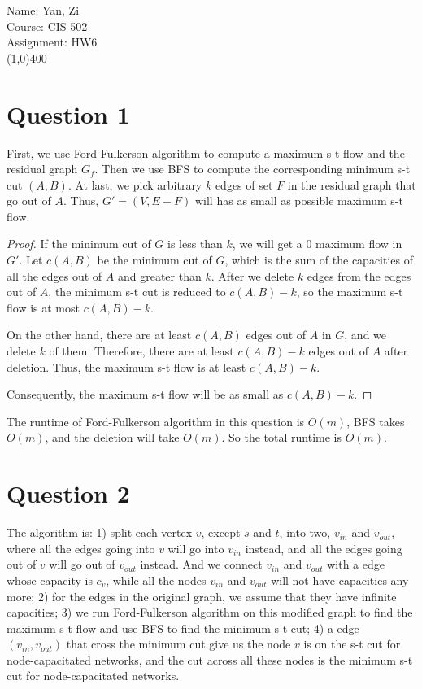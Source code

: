 \documentclass[letter,12pt]{article}
\begin{document}
Name: Yan, Zi \\
Course: CIS 502 \\
Assignment: HW6 \\
\line(1,0){400}
\section*{Question 1}
First, we use Ford-Fulkerson algorithm to compute a maximum s-t flow and 
the residual graph $G_f$. Then we use BFS to compute the corresponding 
minimum s-t cut $(A, B)$. At last, we pick arbitrary $k$ edges of set $F$ in 
the residual graph that go out of $A$. Thus, $G'=(V, E - F)$ will has as small 
as possible maximum s-t flow.

\begin{proof}
If the minimum cut of $G$ is less than $k$, we will get a 0 maximum flow in
$G'$. Let $c(A, B)$ be the minimum cut of $G$, which is the sum of the 
capacities of all the edges out of $A$ and greater than $k$. After we delete 
$k$ edges from the edges out of $A$, the minimum s-t cut is reduced to 
$c(A, B) - k$, so the maximum s-t flow is at most $c(A, B)-k$.

On the other hand, there are at least $c(A, B)$ edges out of $A$ in $G$, and 
we delete $k$ of them. Therefore, there are at least $c(A, B)-k$ edges out of
$A$ after deletion. Thus, the maximum s-t flow is at least $c(A, B)-k$.

Consequently, the maximum s-t flow will be as small as $c(A, B)-k$.
\end{proof}

The runtime of Ford-Fulkerson algorithm in this question is $O(m)$, BFS
takes $O(m)$, and the deletion will take $O(m)$. So the total runtime is
$O(m)$.

\section*{Question 2}
The algorithm is: 1) split each vertex $v$, except $s$ and $t$, into two, 
$v_{in}$ and $v_{out}$, where all the edges going into $v$ will go into 
$v_{in}$ instead, and all the edges going out of $v$ will go out of $v_{out}$ 
instead. And we connect $v_{in}$ and $v_{out}$ with a edge whose capacity 
is $c_v$, while all the nodes $v_{in}$ and $v_{out}$ will not have capacities 
any more; 2) for the edges in the original graph, we assume that they have 
infinite capacities; 3) we run Ford-Fulkerson algorithm on this modified 
graph to find the maximum s-t flow and use BFS to find the minimum s-t 
cut; 4) a edge $(v_{in}, v_{out})$ that cross the minimum cut give us the node 
$v$ is on the s-t cut for node-capacitated networks, and the cut across
all these nodes is the minimum s-t cut for node-capacitated networks.
\end{document}
